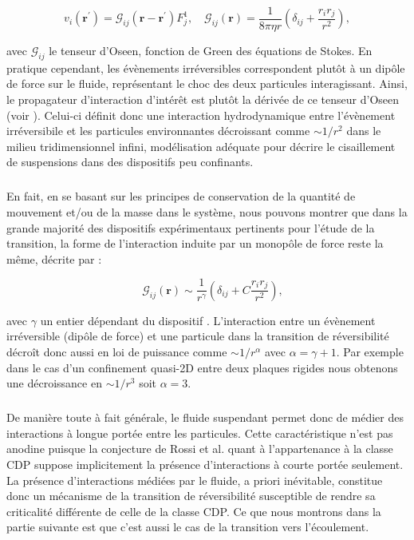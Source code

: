 \begin{equation}
	v_i (\mathbf{r}^\prime) = \mathcal{G}_{ij}(\mathbf{r} -\mathbf{r}^\prime)F^1_j, \quad \mathcal{G}_{ij}(\mathbf{r}) = \frac{1}{8\pi\eta r}\left( \delta_{ij}+\frac{r_ir_j}{r^2} \right),
\end{equation}

\noindent avec $\mathcal{G}_{ij}$ le tenseur d'Oseen, fonction de Green des équations de Stokes. En pratique cependant, les évènements irréversibles correspondent plutôt à un dipôle de force sur le fluide, représentant le choc des deux particules interagissant. Ainsi, le propagateur d'interaction d'intérêt est plutôt la dérivée de ce tenseur d'Oseen (voir ). Celui-ci définit donc une interaction hydrodynamique entre l'évènement irréversibile et les particules environnantes décroissant comme $\sim 1/r^2$ dans le milieu tridimensionnel infini, modélisation adéquate pour décrire le cisaillement de suspensions dans des dispositifs peu confinants.

\subparagraph{}En fait, en se basant sur les principes de conservation de la quantité de mouvement et/ou de la masse dans le système, nous pouvons montrer que dans la grande majorité des dispositifs expérimentaux pertinents pour l'étude de la transition, la forme de l'interaction induite par un monopôle de force reste la même, décrite par :

\begin{equation}
\quad \mathcal{G}_{ij}(\mathbf{r}) \sim \frac{1}{r^\gamma}\left( \delta_{ij}+ C\frac{r_ir_j}{r^2} \right),
\end{equation}

\noindent avec $\gamma$ un entier dépendant du dispositif \cite{diamant_hydrodynamic_2009}. L'interaction entre un évènement irréversible (dipôle de force) et une particule dans la transition de réversibilité décroît donc aussi en loi de puissance comme $\sim 1/r^\alpha$ avec $\alpha = \gamma+1$. Par exemple dans le cas d'un confinement quasi-2D entre deux plaques rigides nous obtenons une décroissance en $\sim 1/r^3$ soit $\alpha = 3$.

\subparagraph{}De manière toute à fait générale, le fluide suspendant permet donc de médier des interactions à longue portée entre les particules. Cette caractéristique n'est pas anodine puisque la conjecture de Rossi et al. \cite{rossi_universality_2000} quant à l'appartenance à la classe CDP suppose implicitement la présence d'interactions à courte portée seulement. La présence d'interactions médiées par le fluide, a priori inévitable, constitue donc un mécanisme de la transition de réversibilité susceptible de rendre sa criticalité différente de celle de la classe CDP. Ce que nous montrons dans la partie suivante est que c'est aussi le cas de la transition vers l'écoulement.

